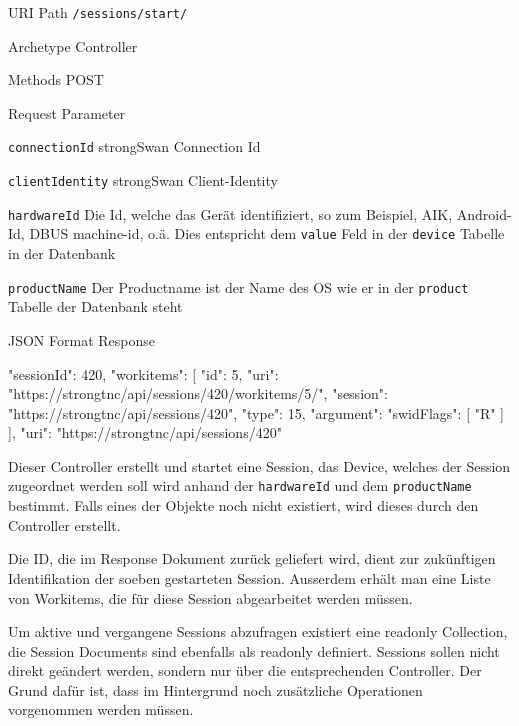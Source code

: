 \begin{mdframed}[style=def]
\begin{description*}
	\item[URI Path] \texttt{/sessions/start/}
	\item[Archetype] Controller
	\item[Methods] POST
	\item[Request Parameter] \hfill
	\begin{description*}
		\item[\texttt{connectionId}] strongSwan Connection Id
		\item[\texttt{clientIdentity}] strongSwan Client-Identity
		\item[\texttt{hardwareId}] Die Id, welche das Gerät identifiziert, so zum
		Beispiel, AIK, Android-Id, DBUS machine-id, o.ä. Dies entspricht dem
		\texttt{value} Feld in der \texttt{device} Tabelle in der Datenbank
		\item[\texttt{productName}] Der Productname ist der Name des OS wie er in der
		\texttt{product} Tabelle der Datenbank steht
	\end{description*}
	\item[JSON Format Response] \hfill
\begin{jsoncode}
{
	"sessionId": 420,
	"workitems": [
		 {
		 	"id": 5,
		 	"uri": "https://strongtnc/api/sessions/420/workitems/5/",
		 	"session": "https://strongtnc/api/sessions/420",
		 	"type": 15,
		 	"argument": {
		 		"swidFlags": [
		 			"R"
		 		]
		 	}
		 }
	],
	"uri": "https://strongtnc/api/sessions/420"
}
\end{jsoncode}
\end{description*}
\end{mdframed}
Dieser Controller erstellt und startet eine Session, das Device, welches der
Session zugeordnet werden soll wird anhand der \texttt{hardwareId} und dem
\texttt{productName} bestimmt. Falls eines der Objekte noch nicht existiert, wird
dieses durch den Controller erstellt.

Die ID, die im Response Dokument zurück geliefert wird, dient zur zukünftigen
Identifikation der soeben gestarteten Session. Ausserdem erhält man eine Liste
von Workitems, die für diese Session abgearbeitet werden müssen.

Um aktive und vergangene Sessions abzufragen existiert eine readonly
Collection, die Session Documents sind ebenfalls als readonly definiert.
Sessions sollen nicht direkt geändert werden, sondern nur über die
entsprechenden Controller. Der Grund dafür ist, dass im Hintergrund noch
zusätzliche Operationen vorgenommen werden müssen.

